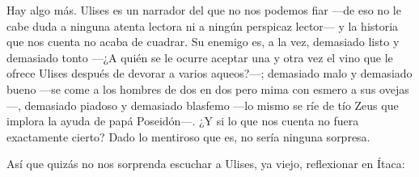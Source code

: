Hay algo más. Ulises es un narrador del que no nos podemos fiar ---de eso no le cabe duda a ninguna atenta lectora ni a ningún perspicaz lector--- y la historia que nos cuenta no acaba de cuadrar. Su enemigo es, a la vez, demasiado listo y demasiado tonto ---¿A quién se le ocurre aceptar una y otra vez el vino que le ofrece Ulises después de devorar a varios aqueos?---; demasiado malo y demasiado bueno ---se come a los hombres de dos en dos pero mima con esmero a sus ovejas---, demasiado piadoso y demasiado blasfemo ---lo mismo se ríe de tío Zeus que implora la ayuda de papá Poseidón---. ¿Y si lo que nos cuenta no fuera exactamente cierto? Dado lo mentiroso que es, no sería ninguna sorpresa.

Así que quizás no nos sorprenda escuchar a Ulises, ya viejo, reflexionar en Ítaca:

